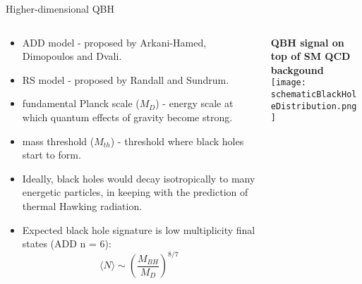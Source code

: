 \documentclass[8pt]{beamer}
\begin{document}
\begin{frame}{\large Higher-dimensional QBH}
\begin{columns}
 \begin{column}{6cm}
  \begin{itemize}
   \item ADD model - proposed by Arkani-Hamed, Dimopoulos and Dvali.
   \item RS model - proposed by Randall and Sundrum.
  \end{itemize}
  \begin{itemize}
   \item fundamental Planck scale ($M_D$) - energy scale at which quantum effects of gravity become strong.
   \item mass threshold ($M_{th}$) - threshold where black holes start to form.
  \end{itemize}
  \begin{itemize}
   \item Ideally, black holes would decay isotropically to many energetic particles, in keeping with the prediction of thermal Hawking radiation.
   \item Expected black hole signature is low multiplicity final states {\small (ADD n = 6)}:
   \begin{equation}
    \langle N \rangle \sim \left( \dfrac{M_{BH}}{M_{D}} \right)^{8/7}
   \end{equation}

  \end{itemize}


 \end{column}
 \begin{column}{6cm}
 
 {\centering
  \textbf{QBH signal on top of SM QCD backgound}
 }
 \vspace{0.4cm}\\
 
  \texttt{[image: schematicBlackHoleDistribution.png]}\\
  
  
 \end{column}
\end{columns}

\end{frame}
\end{document}
